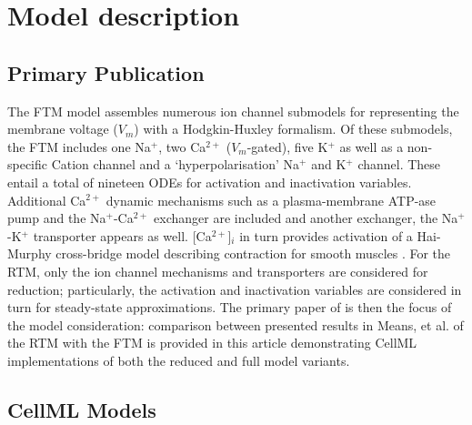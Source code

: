 \documentclass[fleqn,10pt]{physiome}
\newcommand{\cas}{Ca$^{2+}$ }
\newcommand{\cacyts}{[Ca$^{2+}$]$_i$ }
\newcommand{\nas}{Na$^+$ }
\newcommand{\na}{Na$^+$}
\newcommand{\pos}{K$^+$  }
\begin{document}


\section{Model description}

\subsection{Primary Publication}

The FTM model \citep{tong2011} assembles numerous ion channel submodels for representing the membrane voltage ($V_m$) with a Hodgkin-Huxley formalism. Of these submodels, the FTM includes one \na, two \cas ($V_m$-gated), five \pos as well as a non-specific Cation channel and a `hyperpolarisation' \nas and \pos channel. These entail a total of nineteen ODEs for activation and inactivation variables. Additional \cas dynamic mechanisms such as a plasma-membrane ATP-ase pump and the \na-\cas exchanger are included and another exchanger, the \na-\pos transporter appears as well. \cacyts in turn provides activation of a Hai-Murphy cross-bridge model describing contraction for smooth muscles \cite{haimurphy1988}. For the RTM, only the ion channel mechanisms and transporters are considered for reduction; particularly, the activation and inactivation variables are considered in turn for steady-state approximations. The primary paper of \cite{means2022} is then the focus of the model consideration: comparison between presented results in Means, et al. of the RTM with the FTM is provided in this article demonstrating CellML implementations of both the reduced and full model variants.

\subsection{CellML Models}

\end{document}

